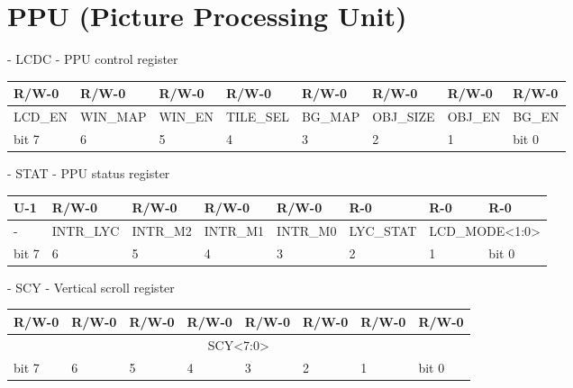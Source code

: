 \documentclass[\main/gbctr.tex]{subfiles}
\begin{document}
\chapter{PPU (Picture Processing Unit)}

\begin{register}[H]
  \caption{ - LCDC - PPU control register}
  {
    \ttfamily
    \begin{tabularx}{\linewidth}{|X|X|X|X|X|X|X|X|}
      \hline
      R/W-0   & R/W-0    & R/W-0   & R/W-0     & R/W-0   & R/W-0     & R/W-0   & R/W-0  \\
      \hline
      LCD\_EN & WIN\_MAP & WIN\_EN & TILE\_SEL & BG\_MAP & OBJ\_SIZE & OBJ\_EN & BG\_EN \\
      \hline
      bit 7   & 6        & 5       & 4         & 3       & 2         & 1       & bit 0  \\
      \hline
    \end{tabularx}{\parfillskip=0pt\par}
  }
\end{register}

\begin{register}[H]
  \caption{ - STAT - PPU status register}
  {
    \ttfamily
    \begin{tabularx}{\linewidth}{|X|X|X|X|X|X|X|X|}
      \hline
      U-1                     & R/W-0     & R/W-0    & R/W-0    & R/W-0    & R-0       & R-0                                  & R-0   \\
      \hline
      \cellcolor{LightGray} - & INTR\_LYC & INTR\_M2 & INTR\_M1 & INTR\_M0 & LYC\_STAT & \multicolumn{2}{c|}{LCD\_MODE<1:0>} \\
      \hline
      bit 7                   & 6         & 5        & 4        & 3        & 2         & 1                                    & bit 0 \\
      \hline
    \end{tabularx}{\parfillskip=0pt\par}
  }
\end{register}

\begin{register}[H]
  \caption{ - SCY - Vertical scroll register}
  {
    \ttfamily
    \begin{tabularx}{\linewidth}{|X|X|X|X|X|X|X|X|}
      \hline
      R/W-0                           & R/W-0 & R/W-0 & R/W-0 & R/W-0 & R/W-0 & R/W-0 & R/W-0 \\
      \hline
      \multicolumn{8}{|c|}{SCY<7:0>} \\
      \hline
      bit 7                           & 6     & 5     & 4     & 3     & 2     & 1     & bit 0 \\
      \hline
    \end{tabularx}{\parfillskip=0pt\par}
  }
\end{register}
\end{document}

